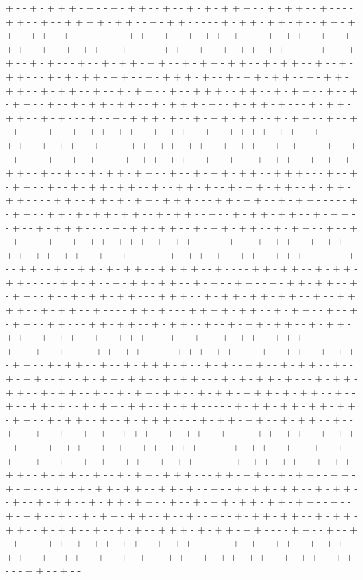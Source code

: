 + - - + - + + + - + - - + - + + - - + - - + - + - + + + - - + - + + - - + - - - - + + - - + - - + + + + - + + - - + - + + - - - - - + - + + - + + - + - - + + - + + - - + + + + - - + - - + - + + - - + - - + - + + - + + - - + - + + - - + - - + - + + - - + - - + - + + - + + - - + - + + - - + - - + - + + - + + - - + - + + - + + - - + - + - - - + - - + - + + - + + - - + - + + - + + - - + - + + - - + - - + - + + - - - + - + - + + - + + - - + - + + + - + - - + - + + - + + - - + - + + - + + - - + - + + - - + - - + - + + - - + - - + + + - - + + - - + - + + - - + - - + - + + - - + - - + - + + - + + - - + - + + + - + - - + - + + - + - - - + - + + - + + - - + - + - - - + - - + - + + + - + - - + - + + - + + - - + - + + - - + - - + - + + - - + - - + - + + - + + - - + - + + - - + - - + + + + - + + - - + - + + - + + - - + - + + - - + - - - - + + - + + - + + - - + - + + - - + - + + - - + - - + - + + - - + - - + - + - - + + - + + - + + - - + - - + - + + - + + - - + - + - + + + - - + - - + - - + - + + - + + - - + - - + - + + - + + - - + + + - - - + - - + - + + - - + - - + - + + - + + - - + - - + + - + - - + - + + - + + - - + - + + - + + - - - - + + - - + + - + - + + - + + + - - - + + - + + - - + - + + - - - - - + - + + - - + + - + - + + - + + - - + - + + - - + - - + - + + - + + - - + - + + - - + - - + - + + + - - - - + - + + - + + - - + - + + - + + - - + - + + - - + - - + - + + - - + - - + - + + - + + + - + - + + - - - - - + - + + - + + - - + - + + - + + - + + - + + - - + - - + - - + - - + - + + - + - - + + - - + + + + - - + - + - - + + - - + - - + + - + - + + - - + + + + - - + - - - - + + - + + - - + - + + - + + - - - - - + + - + - - + - + + - + + - - + - + - - + + - - + - + + - + + - - + - + + - - + - - + - + + - + + - - - + + + - - + - + + - + + - + + - - + - - + + + + - - + - + + - - + - - - - + + - + - - - + + + + - + + - - + - + + - - + - - + - + + - - + + - - - + + - + + - - + - + + - - + - - + - + + - + + - - + - + + - + + - - + - + + - - + - - + + + - - - + - - + - + + - + + - - + + + + - - + - - + - + + - - + - - - - + + - + + + - - - + + + - + + - + - + - - + + - - + - + + - + + - - + - + + - - + - - + - + + + - + - - + - + - - + + - - + - + + - - + - - + - + + - - + - - + - + + - + + - - + - + + - - - + - + - + + - + - - - + - + + - + + - - + - + + - - + - - + - + + - + + - - + - + + - + + + - + - + + - - + - - + - - + + - + - - + - + + - + + - - + - + + - - - - - + - + + - + + - + + - + + - + + - - + - + + - - + - - + - + + + - - - - + - + + - + + - - + - + + - - + - - + - + + - - + - - + - + + + + + - - + - + + - - + - - - - + + - + + - - + - + + - + + - - + - + + - - + - + - - + + - + + + - + - - + - + + - - + - + + - - + - - + - + + - - + - - + - + - - + + - - + - + + - - + - - + - + + - + + - - + - + + - + + - - + - + + - - + - - + - + + - + + + - - - + + - + + - - + - + + - - + + - + - + - - - + - - + - + + - + + - - + + - + - - + - - + - + + - + + - - + - + + - - + - - + - + + - - + - + + - + + - - + - - + - + + - + + - + + - + + - - + - - + - + + - - + - - + - + + - + + - - + - - + - - + - - + - + + - + + - - + - + + - + + - - + - + + - - + - - + - + - - + + + - + - + + - + + - - - - + + - - + - - + - + + - - + + - + - + + - + + - - + - + + - - + - - + - + - - + + - - + - + + - + + - - + + + + - - + - - + - + + - + + - - + - + + - + + - - + - + + - - + + - - - + + - - + - - 